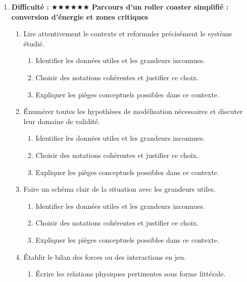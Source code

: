 \documentclass[11pt,a4paper]{article}
\newcommand{\etoiles}[1]{\textbf{Difficulté : }#1}
\begin{document}
\begin{enumerate}[label=\textbf{Très long \arabic*.},leftmargin=*]
\begin{enumerate}[label=\textbf{\arabic*)}]
\begin{enumerate}[label=\alph*)]
\item Comparer au moins deux scénarios différents.
\item Discuter la robustesse du résultat face à une variation de paramètre.
\item Proposer une ouverture vers une situation réelle plus complexe.
\end{enumerate}
\end{enumerate}
\item \etoiles{★★★★★★}
\textbf{Parcours d'un roller coaster simplifié : conversion d'énergie et zones critiques}
\begin{enumerate}[label=\textbf{\arabic*)}]
\item Lire attentivement le contexte et reformuler précisément le système étudié.
\begin{enumerate}[label=\alph*)]
\item Identifier les données utiles et les grandeurs inconnues.
\item Choisir des notations cohérentes et justifier ce choix.
\item Expliquer les pièges conceptuels possibles dans ce contexte.
\end{enumerate}
\item Énumérer toutes les hypothèses de modélisation nécessaires et discuter leur domaine de validité.
\begin{enumerate}[label=\alph*)]
\item Identifier les données utiles et les grandeurs inconnues.
\item Choisir des notations cohérentes et justifier ce choix.
\item Expliquer les pièges conceptuels possibles dans ce contexte.
\end{enumerate}
\item Faire un schéma clair de la situation avec les grandeurs utiles.
\begin{enumerate}[label=\alph*)]
\item Identifier les données utiles et les grandeurs inconnues.
\item Choisir des notations cohérentes et justifier ce choix.
\item Expliquer les pièges conceptuels possibles dans ce contexte.
\end{enumerate}
\item Établir le bilan des forces ou des interactions en jeu.
\begin{enumerate}[label=\alph*)]
\item Écrire les relations physiques pertinentes sous forme littérale.

\end{enumerate}
\end{enumerate}
\end{enumerate}
\end{document}
